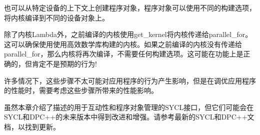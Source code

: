 也可以从特定设备的上下文上创建程序对象，程序对象可以使用不同的构建选项，将内核编译到不同的设备对象上。\par

除了内核Lambda外，之前编译的内核使用get\_kernel将内核传递给parallel\_for。这可以确保使用使用高效数学库构建的内核。如果之前编译的内核没有传递给parallel\_for，那么内核将再次编译，不需要任何构建选项。这可能在功能上是正确的，但肯定不是预期的行为!\par

许多情况下，这些步骤不太可能对应用程序的行为产生影响，但是在调优应用程序的性能时，需要考虑这些步骤所带来的性能影响。\par

\begin{tcolorbox}[colback=blue!5!white,colframe=blue!75!black, title=改进互动性和程序对象管理]
虽然本章介绍了描述的用于互动性和程序对象管理的SYCL接口，但它们可能会在SYCL和DPC++的未来版本中得到改进和增强。请参考最新的SYCL和DPC++文档，以找到更新。
\end{tcolorbox}






































